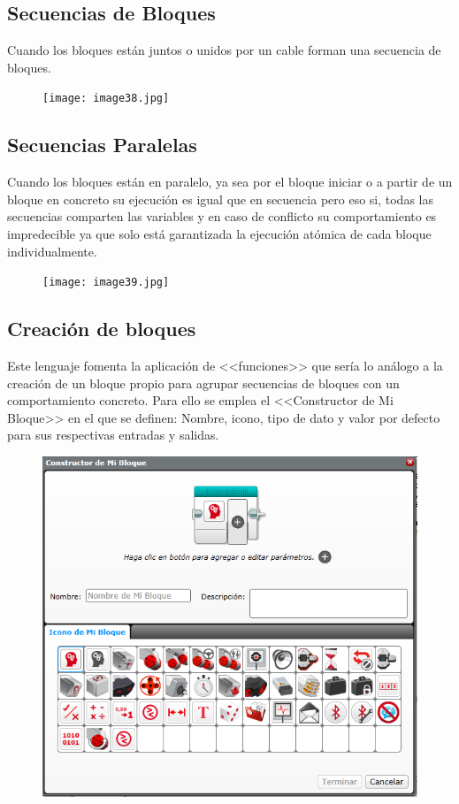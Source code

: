 \documentclass[12pt,a4paper]{article}
\begin{document}
\subsection{Secuencias de Bloques}

Cuando los bloques están juntos o unidos por un cable forman una secuencia de
bloques.

\begin{figure}[H]
	\texttt{[image: image38.jpg]}
	\centering
\end{figure}

\subsection{Secuencias Paralelas}

Cuando los bloques están en paralelo, ya sea por el bloque iniciar o a partir de
un bloque en concreto su ejecución es igual que en secuencia pero eso si, todas
las secuencias comparten las variables y en caso de conflicto su  comportamiento
es impredecible ya que solo está garantizada la ejecución atómica de cada bloque
individualmente.

\begin{figure}[H]
	\texttt{[image: image39.jpg]}
	\centering
\end{figure}

\subsection{Creación de bloques}

Este lenguaje fomenta la aplicación de <<funciones>> que sería lo análogo a la
creación de un bloque propio para agrupar secuencias de bloques con un
comportamiento concreto. Para ello se emplea el <<Constructor de Mi Bloque>> en el
que se definen: Nombre, icono, tipo de dato y valor por defecto para sus
respectivas entradas y salidas.

\begin{figure}[H]
	\includegraphics{ConstructorBloques.PNG} 
	\centering
\end{figure}
\end{document}
